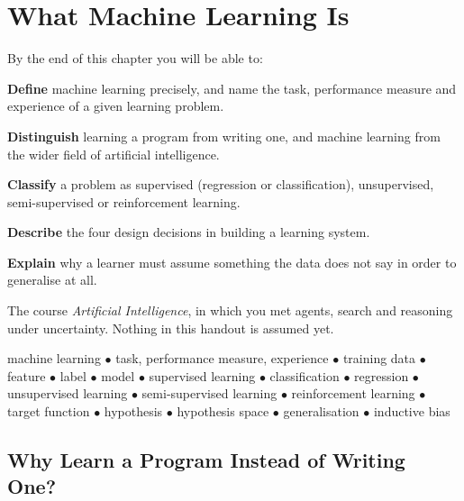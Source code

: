 \chapter{What Machine Learning Is}\label{ch:introduction}

\begin{outcomes}
By the end of this chapter you will be able to:
\begin{tight}
  \item \textbf{Define} machine learning precisely, and name the task,
        performance measure and experience of a given learning problem.
  \item \textbf{Distinguish} learning a program from writing one, and machine
        learning from the wider field of artificial intelligence.
  \item \textbf{Classify} a problem as supervised (regression or
        classification), unsupervised, semi-supervised or reinforcement learning.
  \item \textbf{Describe} the four design decisions in building a learning system.
  \item \textbf{Explain} why a learner must assume something the data does not
        say in order to generalise at all.
\end{tight}
\end{outcomes}

\begin{prereq}
The course \emph{Artificial Intelligence}, in which you met agents, search and
reasoning under uncertainty. Nothing in this handout is assumed yet.
\end{prereq}

\begin{keyterms}
machine learning $\bullet$ task, performance measure, experience $\bullet$
training data $\bullet$ feature $\bullet$ label $\bullet$ model $\bullet$
supervised learning $\bullet$ classification $\bullet$ regression $\bullet$
unsupervised learning $\bullet$ semi-supervised learning $\bullet$
reinforcement learning $\bullet$ target function $\bullet$ hypothesis
$\bullet$ hypothesis space $\bullet$ generalisation $\bullet$ inductive bias
\end{keyterms}

\section{Why Learn a Program Instead of Writing One?}

